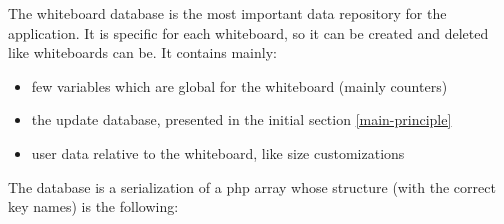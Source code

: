 \documentclass[10pt,a4paper,english]{book}
\begin{document}
The whiteboard database is the most important data repository for the
application. It is specific for each whiteboard, so it can be created
and deleted like whiteboards can be. It contains mainly:
\begin{itemize}
\item {} 
few variables which are global for the whiteboard (mainly counters)

\item {} 
the update database, presented in the initial section \href{\#main-principle}{\ref*{main-principle}}

\item {} 
user data relative to the whiteboard, like size customizations

\end{itemize}

The database is a serialization of a php array whose structure (with
the correct key names) is the following:
\end{document}
